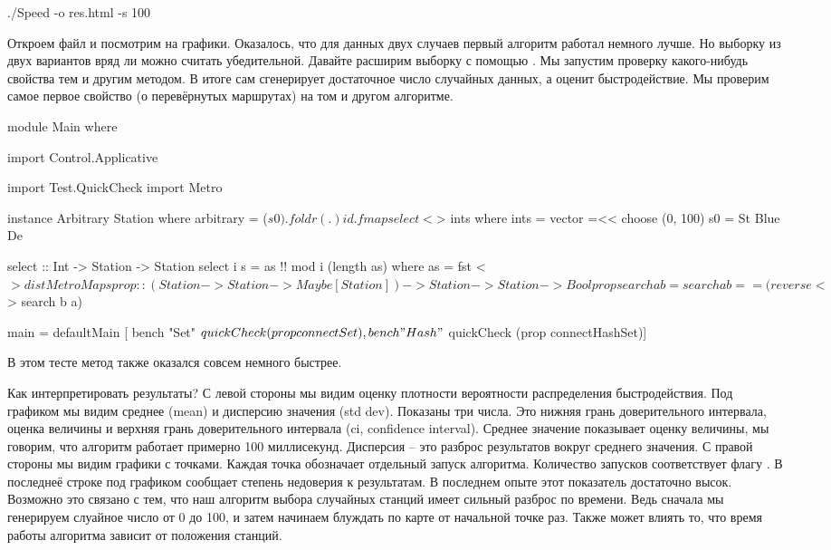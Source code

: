 \begin{code}
./Speed -o res.html -s 100 
\end{code}

Откроем файл  и посмотрим на графики.
Оказалось, что  для данных двух случаев первый алгоритм работал
немного лучше. Но выборку из двух вариантов вряд ли можно считать
убедительной. Давайте расширим выборку с помощью .
Мы запустим проверку какого-нибудь свойства тем и другим методом.
В итоге  сам сгенерирует достаточное число 
случайных данных, а  оценит быстродействие. 
Мы проверим самое первое свойство (о перевёрнутых маршрутах)
на том и другом алгоритме.

\begin{code}
module Main where

import Control.Applicative

import Test.QuickCheck
import Metro

instance Arbitrary Station where
    arbitrary = ($ s0) . foldr (.) id . fmap select <$> ints
        where ints = vector =<< choose (0, 100)
              s0 = St Blue De

select :: Int -> Station -> Station
select i s = as !! mod i (length as)
    where as = fst <$> distMetroMap s

prop :: (Station -> Station -> Maybe [Station]) 
	-> Station -> Station -> Bool
prop search a b = search a b == (reverse <$> search b a)

main = defaultMain [
	bench "Set"  $ quickCheck (prop connectSet),
	bench "Hash" $ quickCheck (prop connectHashSet)]
\end{code}

В этом тесте метод  также оказался совсем немного быстрее.

Как интерпретировать результаты? С левой стороны мы видим 
оценку плотности вероятности распределения быстродействия.
Под графиком мы видим среднее (mean) и дисперсию значения (std dev).
Показаны три числа. Это нижняя грань доверительного интервала, 
оценка величины и верхняя грань доверительного интервала 
(ci, confidence interval). Среднее значение показывает оценку
величины, мы говорим, что алгоритм работает примерно 100 миллисекунд.
Дисперсия -- это разброс результатов вокруг среднего значения. 
С правой стороны мы видим графики с точками. Каждая точка обозначает
отдельный запуск алгоритма. Количество запусков соответствует
флагу . В последнеё строке под графиком 
сообщает степень недоверия к результатам. В последнем 
опыте этот показатель достаточно высок. Возможно это связано с тем,
что наш алгоритм выбора случайных станций имеет сильный разброс по времени.
Ведь сначала мы генерируем слуайное число  от 0 до 100, и затем
начинаем блуждать по карте от начальной точке  раз.
Также может влиять то, что время работы алгоритма зависит
от положения станций.


